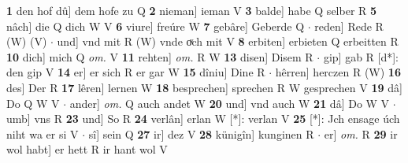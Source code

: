 \documentclass[8pt,a4paper,notitlepage]{article}
\begin{document}
\begin{table}[ht]
\begin{minipage}[t]{0.5\linewidth}
\textbf{1} den hof dû] dem hofe zu Q \textbf{2} nieman] ieman V \textbf{3} balde] habe Q selber R \textbf{5} nâch] die Q dich W V \textbf{6} viure] freúre W \textbf{7} gebâre] Geberde Q  $\cdot$ reden] Rede R (W) (V)  $\cdot$ und] vnd mit R (W) vnde oͮch mit V \textbf{8} erbiten] erbieten Q erbeitten R \textbf{10} dich] mich Q \textit{om.} V \textbf{11} rehten] \textit{om.} R W \textbf{13} disen] Disem R  $\cdot$ gip] gab R [d*]: den gip V \textbf{14} er] er sich R er gar W \textbf{15} dîniu] Dine R  $\cdot$ hêrren] herczen R (W) \textbf{16} des] Der R \textbf{17} lêren] lernen W \textbf{18} besprechen] sprechen R W gesprechen V \textbf{19} dâ] Do Q W V  $\cdot$ ander] \textit{om.} Q auch andet W \textbf{20} und] vnd auch W \textbf{21} dâ] Do W V  $\cdot$ umb] vns R \textbf{23} und] So R \textbf{24} verlân] erlan W [*]: verlan V \textbf{25} [*]: Jch ensage úch niht wa er si V  $\cdot$ sî] sein Q \textbf{27} ir] dez V \textbf{28} künigîn] kunginen R  $\cdot$ er] \textit{om.} R \textbf{29} ir wol habt] er hett R ir hant wol V \newline
\end{minipage}
\end{table}
\end{document}
